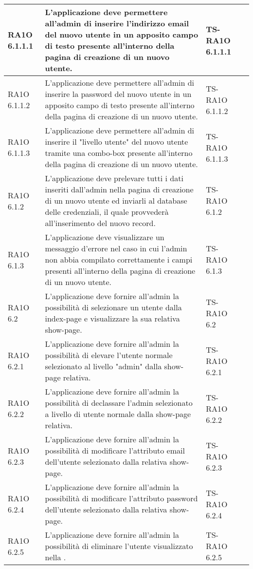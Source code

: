 \begin{center}
\begin{longtable}{| p{2cm} | p{6cm} | p{2.5cm} | p{2.5cm} | }
					RA1O 6.1.1.1 & 
					L'applicazione deve permettere all'admin di inserire l'indirizzo email del nuovo utente in un apposito campo di testo presente all'interno della pagina di creazione di un nuovo utente.
 & TS-RA1O 6.1.1.1 & \\ \hline 
					RA1O 6.1.1.2 & 
					L'applicazione deve permettere all'admin di inserire la password del nuovo utente in un apposito campo di testo presente all'interno della pagina di creazione di un nuovo utente. & TS-RA1O 6.1.1.2 & \\ \hline 
					RA1O 6.1.1.3 & 
					L'applicazione deve permettere all'admin di inserire il "livello utente" del nuovo utente tramite una combo-box presente all'interno della pagina di creazione di un nuovo utente. & TS-RA1O 6.1.1.3 & \\ \hline 
					RA1O 6.1.2 & 
					L'applicazione deve prelevare tutti i dati inseriti dall'admin nella pagina di creazione di un nuovo utente ed inviarli al database delle credenziali, il quale provvederà  all'inserimento del nuovo record. & TS-RA1O 6.1.2 & \\ \hline 
					RA1O 6.1.3 & 
					L'applicazione deve visualizzare un messaggio d'errore nel caso in cui l'admin non abbia compilato correttamente i campi presenti all'interno della pagina di creazione di un nuovo utente. & TS-RA1O 6.1.3 & \\ \hline 
					RA1O 6.2 & 
					L'applicazione deve fornire all'admin la possibilità di selezionare un utente dalla index-page e visualizzare la sua relativa show-page. & TS-RA1O 6.2 & \\ \hline 
					RA1O 6.2.1 & 
					L'applicazione deve fornire all'admin la possibilità di elevare l'utente normale selezionato al livello "admin" dalla show-page relativa. & TS-RA1O 6.2.1 & \\ \hline 
					RA1O 6.2.2 & 
					L'applicazione deve fornire all'admin la possibilità di declassare l'admin selezionato a livello di utente normale dalla show-page relativa. & TS-RA1O 6.2.2 & \\ \hline 
					RA1O 6.2.3 & 
					L'applicazione deve fornire all'admin la possibilità di modificare l'attributo email dell'utente selezionato dalla relativa show-page. & TS-RA1O 6.2.3 & \\ \hline 
					RA1O 6.2.4 & 
					L'applicazione deve fornire all'admin la possibilità di modificare l'attributo password dell'utente selezionato dalla relativa show-page.
 & TS-RA1O 6.2.4 & \\ \hline 
					RA1O 6.2.5 & 
					L'applicazione deve fornire all'admin la possibilità di eliminare l'utente visualizzato nella \glossario{show-page}. & TS-RA1O 6.2.5 & \\ \hline 

\end{longtable}
\end{center}
